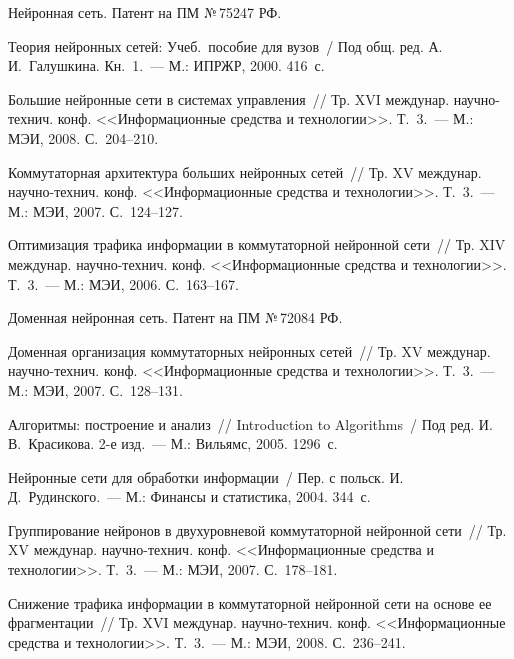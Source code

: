 \begin{multicols}{2}
\vspace*{-6pt}
    
{\small\frenchspacing
{\baselineskip=10.36pt
\begin{thebibliography}{99}

Нейронная сеть. Патент на ПМ №\,75247 РФ.

Теория нейронных сетей: Учеб.\ пособие для вузов~/ Под общ. ред. 
А.\,И.~Галушкина. Кн.~1.~--- М.: ИПРЖР, 2000.  416~с.

Большие нейронные сети в системах управления~// Тр. XVI 
междунар. научно-технич. конф. <<Информационные 
средства и технологии>>. Т.~3.~--- М.: МЭИ, 2008. С.~204--210.

Коммутаторная архитектура больших нейронных сетей~// Тр. XV 
междунар. научно-технич. конф. <<Информационные 
средства и технологии>>. Т.~3.~--- М.: МЭИ, 2007. С.~124--127.

Оптимизация трафика информации в коммутаторной нейронной сети~// 
Тр. XIV междунар. научно-технич. конф. 
<<Информационные средства и технологии>>. Т.~3.~--- М.: МЭИ, 2006. 
С.~163--167.

Доменная нейронная сеть. Патент на ПМ №\,72084 РФ. 

Доменная организация коммутаторных нейронных сетей~// Тр. XV 
междунар. научно-технич. конф. <<Информационные 
средства и технологии>>. Т.~3.~--- М.: МЭИ, 2007. С.~128--131.

Алгоритмы: построение и анализ~// Introduction to Algorithms~/ Под ред. 
И.\,В.~Красикова. 2-е изд.~--- М.: Вильямс, 2005. 1296~с.

Нейронные сети для обработки информации~/ Пер. с польск. 
И.\,Д.~Рудинского.~--- М.: Финансы и статистика, 2004.  344~с.

Группирование нейронов в двух\-уров\-не\-вой коммутаторной нейронной сети~// 
Тр. XV междунар. научно-технич. конф. 
<<Информационные средства и технологии>>. Т.~3.~--- М.: МЭИ, 2007. 
С.~178--181.

\label{end\stat}

Снижение трафика информации в коммутаторной нейронной сети на основе 
ее фрагментации~// Тр. XVI междунар. научно-технич. 
конф. <<Информационные средства и технологии>>. Т.~3.~--- М.: 
МЭИ, 2008. С.~236--241.
 \end{thebibliography}
}
}

\end{multicols}